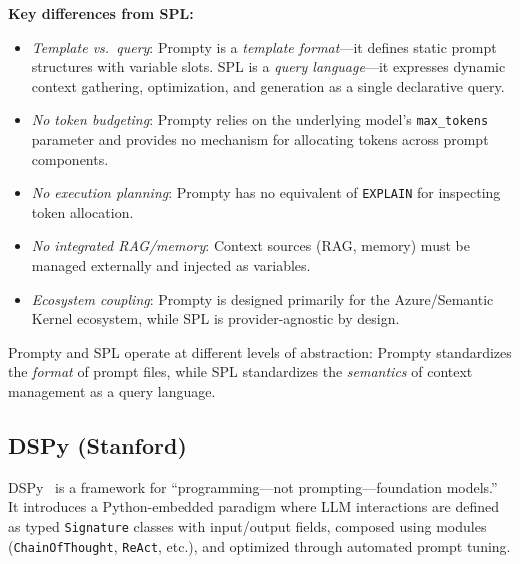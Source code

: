 \documentclass[11pt,a4paper]{article}
\begin{document}
\textbf{Key differences from SPL:}
\begin{itemize}[nosep]
  \item \emph{Template vs.\ query}: Prompty is a \emph{template format}---it defines static prompt structures with variable slots. SPL is a \emph{query language}---it expresses dynamic context gathering, optimization, and generation as a single declarative query.
  \item \emph{No token budgeting}: Prompty relies on the underlying model's \texttt{max\_tokens} parameter and provides no mechanism for allocating tokens across prompt components.
  \item \emph{No execution planning}: Prompty has no equivalent of \texttt{EXPLAIN} for inspecting token allocation.
  \item \emph{No integrated RAG/memory}: Context sources (RAG, memory) must be managed externally and injected as variables.
  \item \emph{Ecosystem coupling}: Prompty is designed primarily for the Azure/Semantic Kernel ecosystem, while SPL is provider-agnostic by design.
\end{itemize}

Prompty and SPL operate at different levels of abstraction: Prompty standardizes the \emph{format} of prompt files, while SPL standardizes the \emph{semantics} of context management as a query language.

\subsection{DSPy (Stanford)}

DSPy~\citep{khattab2023dspy} is a framework for ``programming---not prompting---foundation models.'' It introduces a Python-embedded paradigm where LLM interactions are defined as typed \texttt{Signature} classes with input/output fields, composed using modules (\texttt{ChainOfThought}, \texttt{ReAct}, etc.), and optimized through automated prompt tuning.
\end{document}
